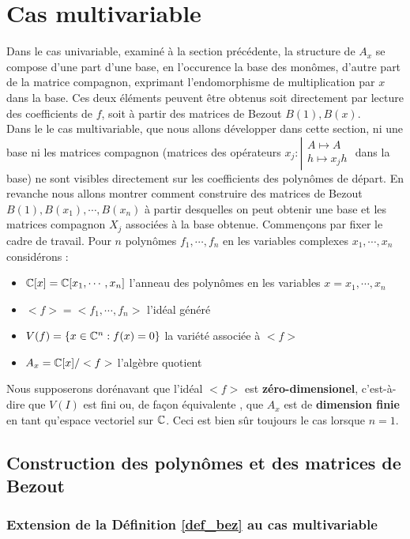 \documentclass{standalone}
\begin{document}
\section{Cas multivariable}
\label{multivariable}

Dans le cas univariable, examiné à la section précédente, la structure de $A_x$ se compose d'une part d'une base, en l'occurence la base des monômes, d'autre part de la matrice compagnon, exprimant l'endomorphisme de multiplication par $x$ dans la base. Ces deux éléments peuvent être obtenus soit directement par lecture des coefficients de $f$, soit à partir des matrices de Bezout $B(1), B(x)$. \\
Dans le le cas multivariable, que nous allons développer dans cette section, ni une base ni les matrices compagnon
(matrices des opérateurs
$x_j : \left\vert
\begin{array}{c}
A \mapsto A \\
h \mapsto x_jh
\end{array}
\right.$ dans la base) ne sont visibles directement sur les coefficients des polynômes de départ. En revanche nous allons montrer comment construire des matrices de Bezout $B(1), B(x_1), \cdots, B(x_n)$ à partir desquelles on peut obtenir une base et les matrices compagnon $X_j$ associées à la base obtenue. Commençons par fixer le cadre de travail.
Pour $n$ polynômes $f_1,\cdots, f_n$ en les variables complexes $x_1,\cdots, x_n$ considérons :
\begin{itemize}
\item $\mathbb{C}[x] = \mathbb{C}[x_1,\cdots, x_n]$ l'anneau des polynômes en les variables $x = x_1,\cdots, x_n$
\item $<f> = <f_1,\cdots, f_n>$ l'idéal généré
\item $V(f) = \{x \in \mathbb{C}^n : f(x) = 0\}$ la variété associée à $<f>$
\item $A_x = \mathbb{C}[x]/<f>$ l'algèbre quotient
\end{itemize}
Nous supposerons dorénavant que l'idéal $<f>$ est {\bf zéro-dimensionel}, c'est-à-dire que $V(I)$ est fini ou, de façon équivalente \cite[p.~234]{clo}, que $A_x$ est de {\bf dimension finie} en tant qu'espace vectoriel sur $\mathbb{C}$. Ceci est bien sûr toujours le cas lorsque $n = 1$.

\subsection{Construction des polynômes et des matrices de Bezout}

\subsubsection{Extension de la Définition \ref{def_bez} au cas multivariable}
\label{def_bez_multi}
\end{document}
